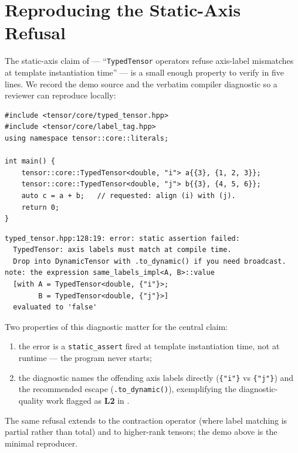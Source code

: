 \documentclass[10pt,twocolumn]{article}
\newcommand{\code}[1]{\texttt{#1}}
\begin{document}
\appendix
\section{Reproducing the Static-Axis Refusal}
\label{app:static-catch-demo}

The static-axis claim of  --- ``\code{TypedTensor}
operators refuse axis-label mismatches at template instantiation
time'' --- is a small enough property to verify in five lines. We
record the demo source and the verbatim compiler diagnostic so a
reviewer can reproduce locally:

\begin{lstlisting}[language=cppx,caption={Demo source: two tensors with
mismatched axis labels are added.},label={lst:demo-source}]
#include <tensor/core/typed_tensor.hpp>
#include <tensor/core/label_tag.hpp>
using namespace tensor::core::literals;

int main() {
    tensor::core::TypedTensor<double, "i"> a{{3}, {1, 2, 3}};
    tensor::core::TypedTensor<double, "j"> b{{3}, {4, 5, 6}};
    auto c = a + b;   // requested: align (i) with (j).
    return 0;
}
\end{lstlisting}

\begin{lstlisting}[basicstyle=\ttfamily\scriptsize,
                   caption={GCC 11.4 diagnostic, essential lines only.},
                   label={lst:demo-error}]
typed_tensor.hpp:128:19: error: static assertion failed:
  TypedTensor: axis labels must match at compile time.
  Drop into DynamicTensor with .to_dynamic() if you need broadcast.
note: the expression same_labels_impl<A, B>::value
  [with A = TypedTensor<double, {"i"}>;
        B = TypedTensor<double, {"j"}>]
  evaluated to 'false'
\end{lstlisting}

Two properties of this diagnostic matter for the central claim:

\begin{enumerate}
  \item the error is a \code{static\_assert} fired at template
        instantiation time, not at runtime --- the program never
        starts;
  \item the diagnostic names the offending axis labels directly
        (\code{\{"i"\}} vs \code{\{"j"\}}) and the recommended escape
        (\code{.to\_dynamic()}), exemplifying the
        diagnostic-quality work flagged as \textbf{L2} in
        .
\end{enumerate}

The same refusal extends to the contraction operator (where label
matching is partial rather than total) and to higher-rank tensors;
the demo above is the minimal reproducer.



\end{document}
